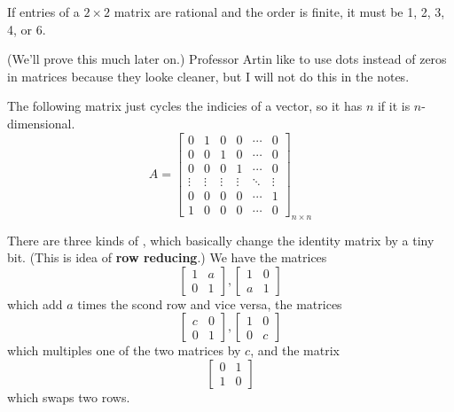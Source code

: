 \documentclass[11pt]{article}
\begin{document}
\begin{theorem}
    If entries of a $2 \times 2$ matrix are rational and the order is finite, it must be 1, 2, 3, 4, or 6.
\end{theorem}

(We'll prove this much later on.) Professor Artin like to use dots instead of zeros in matrices because they looke cleaner, but I will not do this in the notes.

\begin{example}
    The following matrix just cycles the indicies of a vector, so it has $n$ if it is $n$-dimensional.
    \[
        A = \begin{bmatrix}
            0      & 1      & 0      & 0      & \cdots & 0      \\
            0      & 0      & 1      & 0      & \cdots & 0      \\
            0      & 0      & 0      & 1      & \cdots & 0      \\
            \vdots & \vdots & \vdots & \vdots & \ddots & \vdots \\
            0      & 0      & 0      & 0      & \cdots & 1      \\
            1      & 0      & 0      & 0      & \cdots & 0
        \end{bmatrix}_{n \times n}
    \]
\end{example}

There are three kinds of , which basically change
the identity matrix by a tiny bit. (This is idea of \textbf{row reducing}.) We
have the matrices
\[
    \begin{bmatrix}
        1 & a \\
        0 & 1
    \end{bmatrix},
    \begin{bmatrix}
        1 & 0 \\
        a & 1
    \end{bmatrix}
\]
which add $a$ times the scond row and vice versa, the matrices
\[
    \begin{bmatrix}
        c & 0 \\
        0 & 1
    \end{bmatrix},
    \begin{bmatrix}
        1 & 0 \\
        0 & c
    \end{bmatrix}
\]
which multiples one of the two matrices by $c$, and the matrix
\[
    \begin{bmatrix}
        0 & 1 \\
        1 & 0
    \end{bmatrix}
\]
which swaps two rows.
\end{document}
